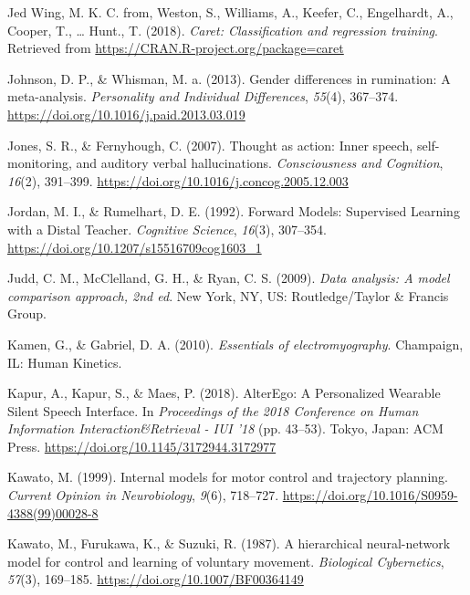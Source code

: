 \documentclass[a4paper,12pt,twoside,openright,oldfontcommands]{memoir}
\begin{document}
\leavevmode\hypertarget{ref-R-caret}{}%
Jed Wing, M. K. C. from, Weston, S., Williams, A., Keefer, C., Engelhardt, A., Cooper, T., \ldots{} Hunt., T. (2018). \emph{Caret: Classification and regression training}. Retrieved from \url{https://CRAN.R-project.org/package=caret}

\leavevmode\hypertarget{ref-Johnson2013}{}%
Johnson, D. P., \& Whisman, M. a. (2013). Gender differences in rumination: A meta-analysis. \emph{Personality and Individual Differences}, \emph{55}(4), 367--374. \url{https://doi.org/10.1016/j.paid.2013.03.019}

\leavevmode\hypertarget{ref-Jones2007}{}%
Jones, S. R., \& Fernyhough, C. (2007). Thought as action: Inner speech, self-monitoring, and auditory verbal hallucinations. \emph{Consciousness and Cognition}, \emph{16}(2), 391--399. \url{https://doi.org/10.1016/j.concog.2005.12.003}

\leavevmode\hypertarget{ref-jordan_forward_1992}{}%
Jordan, M. I., \& Rumelhart, D. E. (1992). Forward Models: Supervised Learning with a Distal Teacher. \emph{Cognitive Science}, \emph{16}(3), 307--354. \url{https://doi.org/10.1207/s15516709cog1603_1}

\leavevmode\hypertarget{ref-judd_data_2009}{}%
Judd, C. M., McClelland, G. H., \& Ryan, C. S. (2009). \emph{Data analysis: A model comparison approach, 2nd ed}. New York, NY, US: Routledge/Taylor \& Francis Group.

\leavevmode\hypertarget{ref-kamen_essentials_2010}{}%
Kamen, G., \& Gabriel, D. A. (2010). \emph{Essentials of electromyography}. Champaign, IL: Human Kinetics.

\leavevmode\hypertarget{ref-kapur_alterego:_2018}{}%
Kapur, A., Kapur, S., \& Maes, P. (2018). AlterEgo: A Personalized Wearable Silent Speech Interface. In \emph{Proceedings of the 2018 Conference on Human Information Interaction\&Retrieval - IUI '18} (pp. 43--53). Tokyo, Japan: ACM Press. \url{https://doi.org/10.1145/3172944.3172977}

\leavevmode\hypertarget{ref-kawato_internal_1999}{}%
Kawato, M. (1999). Internal models for motor control and trajectory planning. \emph{Current Opinion in Neurobiology}, \emph{9}(6), 718--727. \url{https://doi.org/10.1016/S0959-4388(99)00028-8}

\leavevmode\hypertarget{ref-kawato_hierarchical_1987}{}%
Kawato, M., Furukawa, K., \& Suzuki, R. (1987). A hierarchical neural-network model for control and learning of voluntary movement. \emph{Biological Cybernetics}, \emph{57}(3), 169--185. \url{https://doi.org/10.1007/BF00364149}
\end{document}
